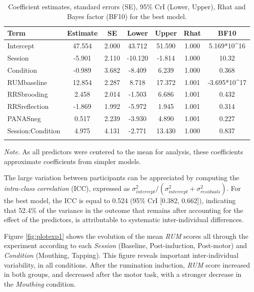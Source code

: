 \documentclass[a4paper,12pt,twoside,openright,oldfontcommands]{memoir}
\begin{document}
\begin{table}[H]
\begin{center}
\begin{threeparttable}
\caption{\label{tab:paramexp2}Coefficient estimates, standard errors (SE), 95\% CrI (Lower, Upper), Rhat and Bayes factor (BF10) for the best model.}
\small{
\begin{tabular}{lcccccc}
\toprule
Term & \multicolumn{1}{c}{Estimate} & \multicolumn{1}{c}{SE} & \multicolumn{1}{c}{Lower} & \multicolumn{1}{c}{Upper} & \multicolumn{1}{c}{Rhat} & \multicolumn{1}{c}{BF10}\\
\midrule
Intercept & 47.554 & 2.000 & 43.712 & 51.590 & 1.000 & 5.169*10\textasciicircum{}16\\
Session & -5.901 & 2.110 & -10.120 & -1.814 & 1.000 & 10.32\\
Condition & -0.989 & 3.682 & -8.409 & 6.239 & 1.000 & 0.368\\
RUMbaseline & 12.854 & 2.287 & 8.718 & 17.372 & 1.001 & -3.695*10\textasciicircum{}17\\
RRSbrooding & 2.458 & 2.014 & -1.503 & 6.686 & 1.001 & 0.432\\
RRSreflection & -1.869 & 1.992 & -5.972 & 1.945 & 1.001 & 0.314\\
PANASneg & 0.517 & 2.239 & -3.930 & 4.890 & 1.001 & 0.227\\
Session:Condition & 4.975 & 4.131 & -2.771 & 13.430 & 1.000 & 0.837\\
\bottomrule
\addlinespace
\end{tabular}
}
\begin{tablenotes}[para]
\textit{Note.} As all predictors were centered to the mean for analysis, these coefficients approximate coefficients from simpler models.
\end{tablenotes}
\end{threeparttable}
\end{center}
\end{table}

The large variation between participants can be appreciated by computing the \emph{intra-class correlation} (ICC), expressed as \(\sigma_{intercept}^{2}/(\sigma_{intercept}^{2}+\sigma_{residuals}^{2})\). For the best model, the ICC is equal to 0.524 (95\% CrI {[}0.382, 0.662{]}), indicating that 52.4\% of the variance in the outcome that remains after accounting for the effect of the predictors, is attributable to systematic inter-individual differences.

Figure \ref{fig:plotexp1} shows the evolution of the mean \emph{RUM} scores all through the experiment according to each \emph{Session} (Baseline, Post-induction, Post-motor) and \emph{Condition} (Mouthing, Tapping). This figure reveals important inter-individual variability, in all conditions. After the rumination induction, \emph{RUM} score increased in both groups, and decreased after the motor task, with a stronger decrease in the \emph{Mouthing} condition.
\end{document}
